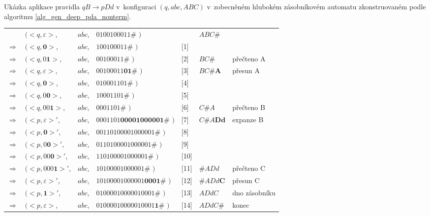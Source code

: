 \begin{Example}
\setlength{\tabcolsep}{\deftabcolsep}

\newpage
Ukázka aplikace pravidla $qB \rightarrow p Dd$ v~konfiguraci $(q, abc, ABC)$ v~zobecněném hlubokém zásobníkovém automatu zkonstruovaném podle algoritmu \ref{alg_gen_deep_pda_nonterm}.
\medskip

\begin{tabular}{lllll|l|l}
                & $( <q, \varepsilon>$,  & $abc$, & $0100100011\#$         $)$ && $ABC\#$ \\
$\Rightarrow$   & $( <q, \mathbf{0}>$,   & $abc$, & $100100011\#$         $)$ &[1]& \\
$\Rightarrow$   & $( <q, 0\mathbf{1}>$,  & $abc$, & $00100011\#$         $)$ &[2]&   $BC\#$ & přečteno A~\\
$\Rightarrow$   & $( <q, \varepsilon>$,  & $abc$, & $00100011\mathbf{01}\#$         $)$ &[3]& $BC\#\mathbf{A}$ & přesun A~\\
$\Rightarrow$   & $( <q, \mathbf{0}>$,   & $abc$, & $010001101\#$         $)$ &[4]& \\
$\Rightarrow$   & $( <q, 0\mathbf{0}>$,  & $abc$, & $10001101\#$         $)$ &[5]& \\
$\Rightarrow$   & $( <q, 00\mathbf{1}>$, & $abc$, & $0001101\#$         $)$ &[6]&    $C\#A$ & přečteno B \\
$\Rightarrow$   & $( <p,\varepsilon>'$,  & $abc$, & $0001101\mathbf{00001000001}\#$         $)$ &[7]& $C\#A\mathbf{Dd}$ & expanze B \\
$\Rightarrow$   & $( <p,\mathbf{0}>'$,   & $abc$, & $00110100001000001\#$         $)$ &[8]& \\
$\Rightarrow$   & $( <p,0\mathbf{0}>'$,  & $abc$, & $0110100001000001\#$         $)$ &[9]& \\
$\Rightarrow$   & $( <p,00\mathbf{0}>'$, & $abc$, & $110100001000001\#$         $)$ &[10]& \\
$\Rightarrow$   & $( <p,000\mathbf{1}>'$,& $abc$, & $10100001000001\#$         $)$ &[11]& $\#ADd$ & přečteno C  \\
$\Rightarrow$   & $( <p,\varepsilon>'$,  & $abc$, & $10100001000001\mathbf{0001}\#$         $)$ &[12]& $\#ADd\mathbf{C}$ & přesun C \\
$\Rightarrow$   & $( <p,\mathbf{1}>'$,   & $abc$, & $01000010000010001\#$         $)$ &[13]& $ADdC$ & dno zásobníku \\
$\Rightarrow$   & $( <p,\varepsilon>$,   & $abc$, & $01000010000010001\mathbf{1}\#$         $)$ &[14]& $ADdC\mathbf{\#}$ & konec
\end{tabular}

\end{Example}
